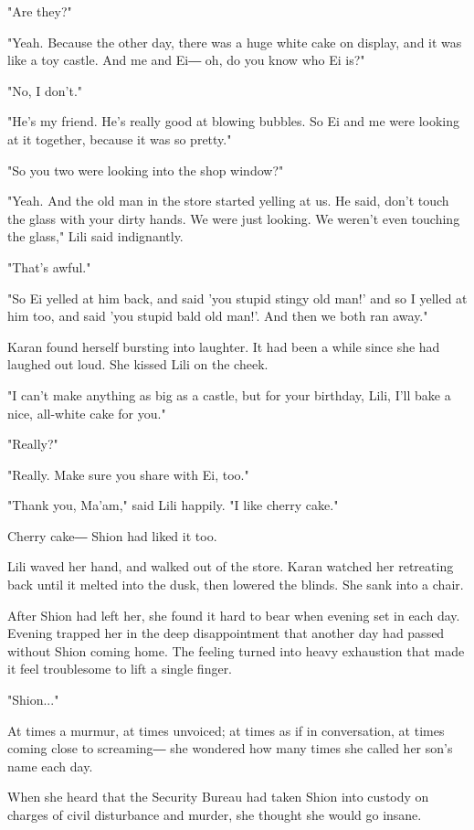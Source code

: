 "Are they?"

"Yeah. Because the other day, there was a huge white cake on display,
and it was like a toy castle. And me and Ei― oh, do you know who Ei is?"

"No, I don't."

"He's my friend. He's really good at blowing bubbles. So Ei and me were
looking at it together, because it was so pretty."

"So you two were looking into the shop window?"

"Yeah. And the old man in the store started yelling at us. He said,
don't touch the glass with your dirty hands. We were just looking. We
weren't even touching the glass," Lili said indignantly.

"That's awful."

"So Ei yelled at him back, and said 'you stupid stingy old man!' and so
I yelled at him too, and said 'you stupid bald old man!'. And then we
both ran away."

Karan found herself bursting into laughter. It had been a while since
she had laughed out loud. She kissed Lili on the cheek.

"I can't make anything as big as a castle, but for your birthday, Lili,
I'll bake a nice, all-white cake for you."

"Really?"

"Really. Make sure you share with Ei, too."

"Thank you, Ma'am," said Lili happily. "I like cherry cake."

Cherry cake― Shion had liked it too.

Lili waved her hand, and walked out of the store. Karan watched her
retreating back until it melted into the dusk, then lowered the blinds.
She sank into a chair.

After Shion had left her, she found it hard to bear when evening set in
each day. Evening trapped her in the deep disappointment that another
day had passed without Shion coming home. The feeling turned into heavy
exhaustion that made it feel troublesome to lift a single finger.

"Shion..."

At times a murmur, at times unvoiced; at times as if in conversation, at
times coming close to screaming― she wondered how many times she called
her son's name each day.

When she heard that the Security Bureau had taken Shion into custody on
charges of civil disturbance and murder, she thought she would go
insane.

